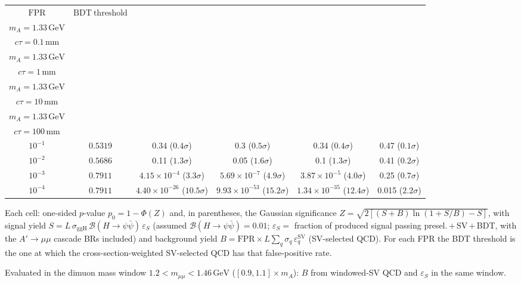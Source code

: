 \documentclass[10pt,a4paper]{article}
\begin{document}
{\begin{tabular}{cccccc}
\toprule
$\mathrm{FPR}$ & $\mathrm{BDT\ threshold}$ & \shortstack{$m_{\pi}=4\,\mathrm{GeV}$\\$m_{A}=1.33\,\mathrm{GeV}$\\$c\tau=0.1\,\mathrm{mm}$} & \shortstack{$m_{\pi}=4\,\mathrm{GeV}$\\$m_{A}=1.33\,\mathrm{GeV}$\\$c\tau=1\,\mathrm{mm}$} & \shortstack{$m_{\pi}=4\,\mathrm{GeV}$\\$m_{A}=1.33\,\mathrm{GeV}$\\$c\tau=10\,\mathrm{mm}$} & \shortstack{$m_{\pi}=4\,\mathrm{GeV}$\\$m_{A}=1.33\,\mathrm{GeV}$\\$c\tau=100\,\mathrm{mm}$} \\
\midrule
$10^{-1}$ & $0.5319$ & 0.34 ($0.4\sigma$) & 0.3 ($0.5\sigma$) & 0.34 ($0.4\sigma$) & 0.47 ($0.1\sigma$)\\
$10^{-2}$ & $0.5686$ & 0.11 ($1.3\sigma$) & 0.05 ($1.6\sigma$) & 0.1 ($1.3\sigma$) & 0.41 ($0.2\sigma$)\\
$10^{-3}$ & $0.7911$ & $4.15\times10^{-4}$ ($3.3\sigma$) & $5.69\times10^{-7}$ ($4.9\sigma$) & $3.87\times10^{-5}$ ($4.0\sigma$) & 0.25 ($0.7\sigma$)\\
$10^{-4}$ & $0.7911$ & $4.40\times10^{-26}$ ($10.5\sigma$) & $9.93\times10^{-53}$ ($15.2\sigma$) & $1.34\times10^{-35}$ ($12.4\sigma$) & 0.015 ($2.2\sigma$)\\
\bottomrule
\end{tabular}

{\small Each cell: one-sided $p$-value $p_0=1-\Phi(Z)$ and, in parentheses, the Gaussian significance $Z=\sqrt{2\left[(S{+}B)\ln(1{+}S/B)-S\right]}$, with signal yield $S=L\,\sigma_{\mathrm{ggH}}\,\mathcal{B}(H\to\psi\bar{\psi})\,\varepsilon_S$ (assumed $\mathcal{B}(H\to\psi\bar{\psi})=0.01$; $\varepsilon_S=$ fraction of produced signal passing presel.\,$+$\,SV\,$+$\,BDT, with the $A'\to\mu\mu$ cascade BRs included) and background yield $B=\mathrm{FPR}\times L\sum_q\sigma_q\,\varepsilon_q^{\mathrm{SV}}$ (SV-selected QCD). For each FPR the BDT threshold is the one at which the cross-section-weighted SV-selected QCD has that false-positive rate.}

{\small Evaluated in the dimuon mass window $1.2<m_{\mu\mu}<1.46\,\mathrm{GeV}$ ($[0.9,1.1]\times m_A$): $B$ from windowed-SV QCD and $\varepsilon_S$ in the same window.}

}\clearpage
\end{document}
